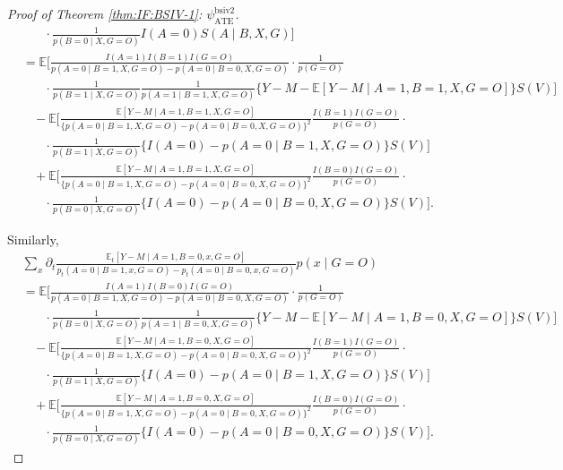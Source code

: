\documentclass[10pt]{article}
\begin{document}
\begin{proof}[Proof of Theorem \ref{thm:IF:BSIV-1}: $\psi_{\text{ATE}}^{\text{bsiv2}}$]
{\begin{align*}
    &\ \ \ \ \ \ \ \ \cdot\frac{1}{p(B=0\mid X, G=O)}I(A=0)S(A\mid B,X,G)\bigg]\\
    &=\mathbb{E}\bigg[\frac{I(A=1)I(B=1)I(G=O)}{p(A=0\mid B=1,X,G=O)-p(A=0\mid B=0,X,G=O)}\cdot\frac{1}{p(G=O)}\\
    &\ \ \ \ \ \ \ \ \cdot\frac{1}{p(B=1\mid X,G=O)}\frac{1}{p(A=1\mid B=1,X,G=O)}\{Y-M-\mathbb{E}[Y-M\mid A=1,B=1,X,G=O]\}S(V)\bigg]\\
    &\ \ \ \ -\mathbb{E}\bigg[\frac{\mathbb{E}[Y-M\mid A=1,B=1,X,G=O]}{\{p(A=0\mid B=1,X,G=O)-p(A=0\mid B=0,X,G=O)\}^2}\frac{I(B=1)I(G=O)}{p(G=O)}\cdot\\
    &\ \ \ \ \ \ \ \ \cdot\frac{1}{p(B=1\mid X, G=O)}\{I(A=0)-p(A=0\mid B=1,X,G=O)\}S(V)\bigg]\\
    &\ \ \ \ +\mathbb{E}\bigg[\frac{\mathbb{E}[Y-M\mid A=1,B=1,X,G=O]}{\{p(A=0\mid B=1,X,G=O)-p(A=0\mid B=0,X,G=O)\}^2}\frac{I(B=0)I(G=O)}{p(G=O)}\cdot\\
    &\ \ \ \ \ \ \ \ \cdot\frac{1}{p(B=0\mid X, G=O)}\{I(A=0)-p(A=0\mid B=0,X,G=O)\}S(V)\bigg].
\end{align*}}

Similarly,
{\footnotesize \begin{align*}
    &\sum_{x}\partial_t\frac{\mathbb{E}_t[Y-M\mid A=1,B=0,x,G=O]}{p_t(A=0\mid B=1,x,G=O)-p_t(A=0\mid B=0,x,G=O)}p(x\mid G=O)\\
    &=\mathbb{E}\bigg[\frac{I(A=1)I(B=0)I(G=O)}{p(A=0\mid B=1,X,G=O)-p(A=0\mid B=0,X,G=O)}\cdot\frac{1}{p(G=O)}\\
    &\ \ \ \ \ \ \ \ \cdot\frac{1}{p(B=0\mid X,G=O)}\frac{1}{p(A=1\mid B=0,X,G=O)}\{Y-M-\mathbb{E}[Y-M\mid A=1,B=0,X,G=O]\}S(V)\bigg]\\
    &\ \ \ \ -\mathbb{E}\bigg[\frac{\mathbb{E}[Y-M\mid A=1,B=0,X,G=O]}{\{p(A=0\mid B=1,X,G=O)-p(A=0\mid B=0,X,G=O)\}^2}\frac{I(B=1)I(G=O)}{p(G=O)}\cdot\\
    &\ \ \ \ \ \ \ \ \cdot\frac{1}{p(B=1\mid X, G=O)}\{I(A=0)-p(A=0\mid B=1,X,G=O)\}S(V)\bigg]\\
    &\ \ \ \ +\mathbb{E}\bigg[\frac{\mathbb{E}[Y-M\mid A=1,B=0,X,G=O]}{\{p(A=0\mid B=1,X,G=O)-p(A=0\mid B=0,X,G=O)\}^2}\frac{I(B=0)I(G=O)}{p(G=O)}\cdot\\
    &\ \ \ \ \ \ \ \ \cdot\frac{1}{p(B=0\mid X, G=O)}\{I(A=0)-p(A=0\mid B=0,X,G=O)\}S(V)\bigg].
\end{align*}}


\end{proof}
\end{document}
